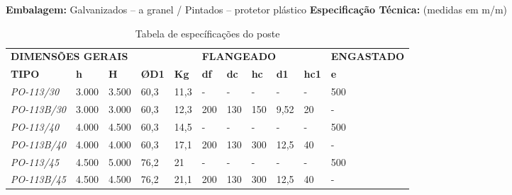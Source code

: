 \begin{itemize}
	{\bf Embalagem:} Galvanizados – a granel  /  Pintados – protetor plástico
	{\bf Especificação Técnica:} (medidas em m/m)
	
\begin{table}[h]
\center
\caption{Tabela de específicações do poste}
\begin{tabular}{lllllllllll}
 &  &  &  &  &  &  &  &  &  &  \\ \hline
\multicolumn{5}{|l|}{{\bf DIMENSÕES GERAIS}} & \multicolumn{5}{l|}{{\bf FLANGEADO}} & \multicolumn{1}{l|}{{\bf ENGASTADO}} \\ \hline
\multicolumn{1}{|l|}{{\bf TIPO}} & \multicolumn{1}{l|}{{\bf h}} & \multicolumn{1}{l|}{{\bf H}} & \multicolumn{1}{l|}{{\bf ØD1}} & \multicolumn{1}{l|}{{\bf Kg}} & \multicolumn{1}{l|}{{\bf df}} & \multicolumn{1}{l|}{{\bf dc}} & \multicolumn{1}{l|}{{\bf hc}} & \multicolumn{1}{l|}{{\bf d1}} & \multicolumn{1}{l|}{{\bf hc1}} & \multicolumn{1}{l|}{{\bf e}} \\ \hline
\multicolumn{1}{|l|}{{\it PO-113/30}} & \multicolumn{1}{l|}{3.000} & \multicolumn{1}{l|}{3.500} & \multicolumn{1}{l|}{60,3} & \multicolumn{1}{l|}{11,3} & \multicolumn{1}{l|}{-} & \multicolumn{1}{l|}{-} & \multicolumn{1}{l|}{-} & \multicolumn{1}{l|}{-} & \multicolumn{1}{l|}{-} & \multicolumn{1}{l|}{500} \\ \hline
\multicolumn{1}{|l|}{{\it PO-113B/30}} & \multicolumn{1}{l|}{3.000} & \multicolumn{1}{l|}{3.000} & \multicolumn{1}{l|}{60,3} & \multicolumn{1}{l|}{12,3} & \multicolumn{1}{l|}{200} & \multicolumn{1}{l|}{130} & \multicolumn{1}{l|}{150} & \multicolumn{1}{l|}{9,52} & \multicolumn{1}{l|}{20} & \multicolumn{1}{l|}{-} \\ \hline
\multicolumn{1}{|l|}{{\it PO-113/40}} & \multicolumn{1}{l|}{4.000} & \multicolumn{1}{l|}{4.500} & \multicolumn{1}{l|}{60,3} & \multicolumn{1}{l|}{14,5} & \multicolumn{1}{l|}{-} & \multicolumn{1}{l|}{-} & \multicolumn{1}{l|}{-} & \multicolumn{1}{l|}{-} & \multicolumn{1}{l|}{-} & \multicolumn{1}{l|}{500} \\ \hline
\multicolumn{1}{|l|}{{\it PO-113B/40}} & \multicolumn{1}{l|}{4.000} & \multicolumn{1}{l|}{4.000} & \multicolumn{1}{l|}{60,3} & \multicolumn{1}{l|}{17,1} & \multicolumn{1}{l|}{200} & \multicolumn{1}{l|}{130} & \multicolumn{1}{l|}{300} & \multicolumn{1}{l|}{12,5} & \multicolumn{1}{l|}{40} & \multicolumn{1}{l|}{-} \\ \hline
\multicolumn{1}{|l|}{{\it PO-113/45}} & \multicolumn{1}{l|}{4.500} & \multicolumn{1}{l|}{5.000} & \multicolumn{1}{l|}{76,2} & \multicolumn{1}{l|}{21} & \multicolumn{1}{l|}{-} & \multicolumn{1}{l|}{-} & \multicolumn{1}{l|}{-} & \multicolumn{1}{l|}{-} & \multicolumn{1}{l|}{-} & \multicolumn{1}{l|}{500} \\ \hline
\multicolumn{1}{|l|}{{\it PO-113B/45}} & \multicolumn{1}{l|}{4.500} & \multicolumn{1}{l|}{4.500} & \multicolumn{1}{l|}{76,2} & \multicolumn{1}{l|}{21,1} & \multicolumn{1}{l|}{200} & \multicolumn{1}{l|}{130} & \multicolumn{1}{l|}{300} & \multicolumn{1}{l|}{12,5} & \multicolumn{1}{l|}{40} & \multicolumn{1}{l|}{-} \\ \hline
\end{tabular}
\end{table}


\end{itemize}
